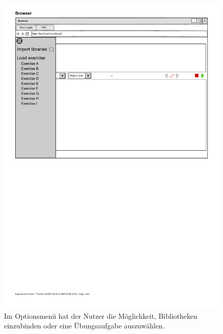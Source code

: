 \documentclass[parskip=full,11pt,twoside]{scrartcl}
\begin{document}
\begin{figure}[H]
	\centering
	\includegraphics[width=\textwidth]{img/wavelength_exercise_menu_open}
	\caption{\label{fig:exmenu}Im Optionsmenü hat der Nutzer die Möglichkeit, Bibliotheken einzubinden oder eine Übungsaufgabe auszuwählen.}
\end{figure}
\end{document}
